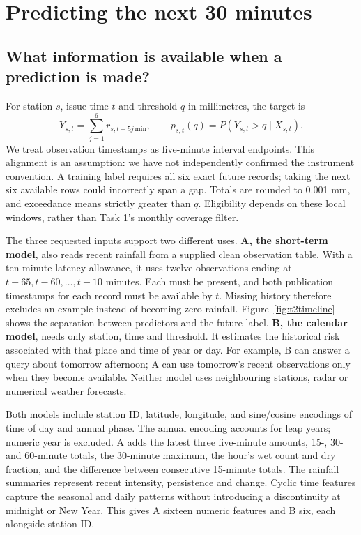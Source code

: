 \section{Predicting the next 30 minutes}
\subsection{What information is available when a prediction is made?}
For station $s$, issue time $t$ and threshold $q$ in millimetres, the target is
\[
Y_{s,t}=\sum_{j=1}^{6}r_{s,t+5j\,\mathrm{min}},\qquad
p_{s,t}(q)=P(Y_{s,t}>q\mid X_{s,t}).
\]
We treat observation timestamps as five-minute interval endpoints. This alignment is an assumption: we have not independently confirmed the instrument convention. A training label requires all six exact future records; taking the next six available rows could incorrectly span a gap. Totals are rounded to 0.001 mm, and exceedance means strictly greater than $q$. Eligibility depends on these local windows, rather than Task 1's monthly coverage filter.

The three requested inputs support two different uses. \textbf{A, the short-term model}, also reads recent rainfall from a supplied clean observation table. With a ten-minute latency allowance, it uses twelve observations ending at $t-65,t-60,\ldots,t-10$ minutes. Each must be present, and both publication timestamps for each record must be available by $t$. Missing history therefore excludes an example instead of becoming zero rainfall. Figure~\ref{fig:t2timeline} shows the separation between predictors and the future label.
\textbf{B, the calendar model}, needs only station, time and threshold. It estimates the historical risk associated with that place and time of year or day. For example, B can answer a query about tomorrow afternoon; A can use tomorrow's recent observations only when they become available. Neither model uses neighbouring stations, radar or numerical weather forecasts.

Both models include station ID, latitude, longitude, and sine/cosine encodings of time of day and annual phase. The annual encoding accounts for leap years; numeric year is excluded. A adds the latest three five-minute amounts, 15-, 30- and 60-minute totals, the 30-minute maximum, the hour's wet count and dry fraction, and the difference between consecutive 15-minute totals. The rainfall summaries represent recent intensity, persistence and change. Cyclic time features capture the seasonal and daily patterns without introducing a discontinuity at midnight or New Year. This gives A sixteen numeric features and B six, each alongside station ID.

